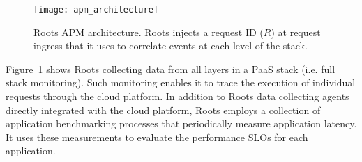 %
%
\begin{figure}
\centering
\texttt{[image: apm\_architecture]}
\caption{Roots APM architecture.  Roots injects a request ID ($R$) at request
ingress that it uses to correlate events at each level of the stack.}
\label{fig:apm_architecture}
\end{figure}
%

Figure~\ref{fig:apm_architecture} shows Roots collecting data from all
layers in a PaaS stack (i.e. full stack monitoring). 
Such monitoring enables it to trace the execution of individual requests
through the cloud platform. In addition
to Roots data collecting agents directly integrated with the cloud platform, Roots employs
a collection of application benchmarking processes that periodically measure
application latency. It uses these measurements to
evaluate the performance SLOs for each application.


